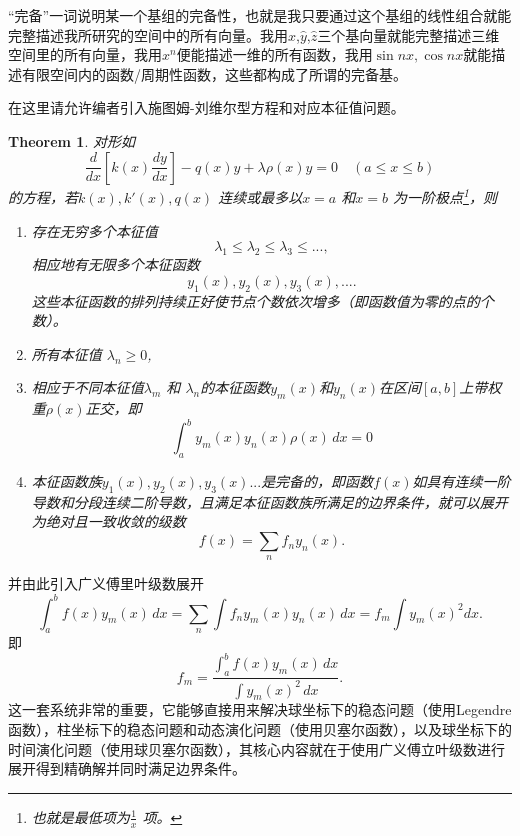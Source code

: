 \documentclass{article}
\newtheorem{theorem}{Theorem}[section]
\numberwithin{equation}{section}
\begin{document}
    ``完备''一词说明某一个基组的完备性，也就是我只要通过这个基组的线性组合就能完整描述我所研究的空间中的所有向量。我用$\hat{x}$,$\hat{y}$,$\hat{z}$三个基向量就能完整描述三维空间里的所有向量，我用${x^n}$便能描述一维的所有函数，我用${\sin{nx},\cos{nx}}$就能描述有限空间内的函数/周期性函数，这些都构成了所谓的完备基。

    在这里请允许编者引入施图姆-刘维尔型方程和对应本征值问题。
    \begin{theorem}
    	对形如
	\begin{equation}
		\frac{d }{d x} \left[ k(x) \frac{d y}{d x}  \right] -q(x)y + \lambda \rho(x) y = 0 \quad (a\leqslant x \leqslant b)
	\end{equation}
	的方程，若$k(x),k'(x),q(x)$ 连续或最多以$x=a$ 和$x=b$ 为一阶极点\footnote{也就是最低项为$\frac{1}{x}$ 项。}，则
	\begin{enumerate}
		\item 存在无穷多个本征值
		\[
		\lambda_1 \leqslant \lambda_2 \leqslant \lambda_3 \leqslant ...
		,\] 
		相应地有无限多个本征函数
		\[
			y_1(x),y_2(x),y_3(x),...
		.\] 
		这些本征函数的排列持续正好使节点个数依次增多（即函数值为零的点的个数）。
		\item 所有本征值 $\lambda_n \geqslant 0$,
		\item 相应于不同本征值$\lambda_m$ 和 $\lambda_n$的本征函数$y_m(x)$和$y_n(x)$在区间$[a,b]$上带权重$\rho(x)$正交，即
			\begin{equation}
				\int ^b_a y_m(x) y_n(x) \rho(x) \, dx = 0 
			\end{equation}
		\item 本征函数族$y_1(x),y_2(x),y_3(x)...$是完备的，即函数$f(x)$如具有连续一阶导数和分段连续二阶导数，且满足本征函数族所满足的边界条件，就可以展开为绝对且一致收敛的级数
			\[
				f(x) = \sum_n f_n y_n(x)
			.\] 
	\end{enumerate}
    \end{theorem}
    并由此引入广义傅里叶级数展开
    \[
	    \int ^b_a f(x) y_m(x) \, dx = \sum_n \int f_n y_m(x)y_n(x) \, dx = f_m \int y_m(x)^2 dx   
    .\] 
    即
    \[
	    f_m = \frac{\int ^b_a f(x) y_m(x) \, dx }{\int y_m(x)^2 \, dx }
    .\] 
    这一套系统非常的重要，它能够直接用来解决球坐标下的稳态问题（使用Legendre函数），柱坐标下的稳态问题和动态演化问题（使用贝塞尔函数），以及球坐标下的时间演化问题（使用球贝塞尔函数），其核心内容就在于使用广义傅立叶级数进行展开得到精确解并同时满足边界条件。
\end{document}
